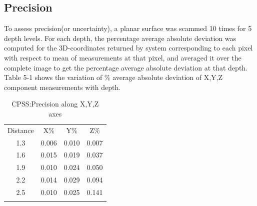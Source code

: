 \subsection{Precision}
\label{experiment:precision}
To assess precision(or uncertainty), a planar surface was scammed 10 times for 5 depth levels. For each depth, the percentage average absolute deviation was computed for the 3D-coordinates returned by system corresponding to each pixel with respect to mean of measurements at that pixel, and averaged it over the complete image to get the percentage average absolute deviation at that depth. Table 5-1 shows the variation of \% average absolute deviation of X,Y,Z component measurements with depth.
\begin{table}[ht]
\centering
\label{tab:1}       %
\begin{tabular}{c c c c}
\hline\noalign{\smallskip}
Distance & X\% & Y\% & Z\% \\
\noalign{\smallskip}\hline\noalign{\smallskip}
1.3 & 0.006 & 0.010 & 0.007 \\
1.6 & 0.015 & 0.019 & 0.037\\
1.9 & 0.010 & 0.024 & 0.050 \\
2.2 & 0.014 & 0.029 & 0.094\\
2.5 & 0.010 & 0.025 & 0.141 \\
\noalign{\smallskip}\hline
\end{tabular}
\caption{CPSS:Precision along X,Y,Z axes}
\end{table}

